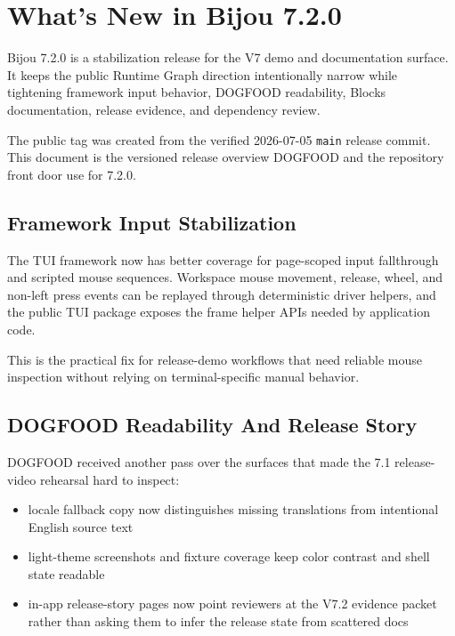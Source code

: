 \chapter{What's New in Bijou 7.2.0}\label{record-283}

\smallskip

Bijou 7.2.0 is a stabilization release for the V7 demo and documentation surface. It keeps the public Runtime Graph direction intentionally narrow while tightening framework input behavior, DOGFOOD readability, Blocks documentation, release evidence, and dependency review.

The public tag was created from the verified 2026-07-05 \texttt{m\allowbreak{}a\allowbreak{}i\allowbreak{}n} release commit. This document is the versioned release overview DOGFOOD and the repository front door use for 7.2.0.

\section{Framework Input Stabilization}\label{record-283-framework-input-stabilization}

The TUI framework now has better coverage for page-scoped input fallthrough and scripted mouse sequences. Workspace mouse movement, release, wheel, and non-left press events can be replayed through deterministic driver helpers, and the public TUI package exposes the frame helper APIs needed by application code.

This is the practical fix for release-demo workflows that need reliable mouse inspection without relying on terminal-specific manual behavior.

\section{DOGFOOD Readability And Release Story}\label{record-283-dogfood-readability-and-release-story}

DOGFOOD received another pass over the surfaces that made the 7.1 release-video rehearsal hard to inspect:

\begin{itemize}
\tightlist
\item
  locale fallback copy now distinguishes missing translations from intentional English source text
\item
  light-theme screenshots and fixture coverage keep color contrast and shell state readable
\item
  in-app release-story pages now point reviewers at the V7.2 evidence packet rather than asking them to infer the release state from scattered docs
\end{itemize}

